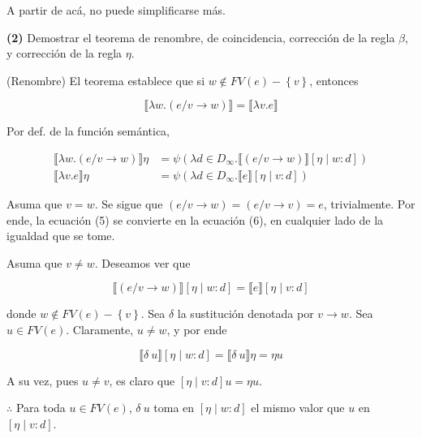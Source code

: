 \documentclass[article, 12pt]{article}
\begin{document}
A partir de acá, no puede simplificarse más.

\pagebreak 

\begin{myframe}
 \textbf{(2)} Demostrar el teorema de renombre, de coincidencia, corrección de
 la regla $\beta$, y corrección de la regla $\eta$.
\end{myframe}

(Renombre) El teorema establece que si $w \not\in FV(e) - \left\{ v \right\} $, entonces 

\begin{equation*}
  \llbracket \lambda w.(e / v \to w) \rrbracket = \llbracket \lambda v.e \rrbracket
\end{equation*}

Por def. de la función semántica,

\begin{align}
  \llbracket \lambda w.(e / v \to  w) \rrbracket \eta &= \psi(\lambda d \in
  D_\infty.\llbracket (e/v\to w) \rrbracket[\eta\mid w : d])\\
  \llbracket \lambda v.e \rrbracket\eta &= \psi\left( \lambda d \in
  D_\infty.\llbracket e \rrbracket[\eta\mid v : d] \right) 
\end{align}


Asuma que $v = w$. Se sigue que $(e / v \to w) = (e / v \to v) = e$,
trivialmente. Por ende, la ecuación (5) se convierte en la ecuación (6), en
cualquier lado de la igualdad que se tome.

Asuma que $v \neq w$. Deseamos ver que 

\begin{equation*}
  \llbracket (e / v \to  w) \rrbracket[\eta \mid w : d] = \llbracket e
  \rrbracket[\eta \mid v : d]
\end{equation*}

donde $w \not\in FV(e) - \left\{ v \right\} $. Sea $\delta$ la sustitución
denotada por $v \to w$. Sea $u \in FV(e)$. Claramente, $u \neq w$, y por ende 

\begin{equation*}
  \llbracket \delta ~ u \rrbracket[\eta \mid w : d] = \llbracket \delta ~ u \rrbracket \eta =
  \eta u
\end{equation*}

A su vez, pues $u \neq v$, es claro que $[\eta \mid v : d] u =  \eta u$.

$\therefore $ Para toda $u \in FV(e)$,  $\delta ~ u$ toma en $[\eta \mid w : d]$
el mismo valor que $u$ en $[\eta \mid v : d]$.
\end{document}
